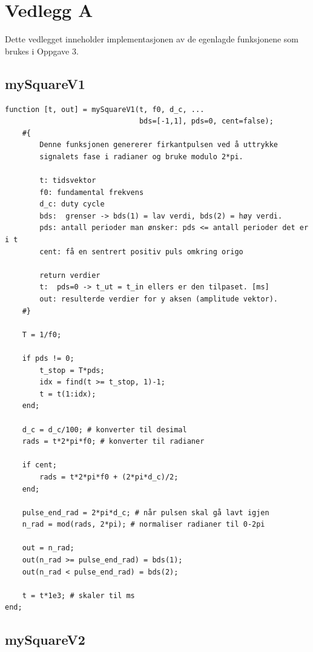\hypertarget{Vedlegg A}{}
\section*{Vedlegg A}
\appendix

Dette vedlegget inneholder implementasjonen av de egenlagde
funksjonene som brukes i Oppgave 3.

\subsection*{mySquareV1}

\begin{verbatim}
function [t, out] = mySquareV1(t, f0, d_c, ...
                               bds=[-1,1], pds=0, cent=false);
    #{
        Denne funksjonen genererer firkantpulsen ved å uttrykke
        signalets fase i radianer og bruke modulo 2*pi.

        t: tidsvektor
        f0: fundamental frekvens
        d_c: duty cycle
        bds:  grenser -> bds(1) = lav verdi, bds(2) = høy verdi.
        pds: antall perioder man ønsker: pds <= antall perioder det er i t
        cent: få en sentrert positiv puls omkring origo

        return verdier
        t:  pds=0 -> t_ut = t_in ellers er den tilpaset. [ms]
        out: resulterde verdier for y aksen (amplitude vektor).
    #}

    T = 1/f0;

    if pds != 0;
        t_stop = T*pds;
        idx = find(t >= t_stop, 1)-1;
        t = t(1:idx);
    end;

    d_c = d_c/100; # konverter til desimal
    rads = t*2*pi*f0; # konverter til radianer

    if cent;
        rads = t*2*pi*f0 + (2*pi*d_c)/2;
    end;

    pulse_end_rad = 2*pi*d_c; # når pulsen skal gå lavt igjen
    n_rad = mod(rads, 2*pi); # normaliser radianer til 0-2pi

    out = n_rad; 
    out(n_rad >= pulse_end_rad) = bds(1);
    out(n_rad < pulse_end_rad) = bds(2);

    t = t*1e3; # skaler til ms
end;
\end{verbatim}


\subsection*{mySquareV2}

